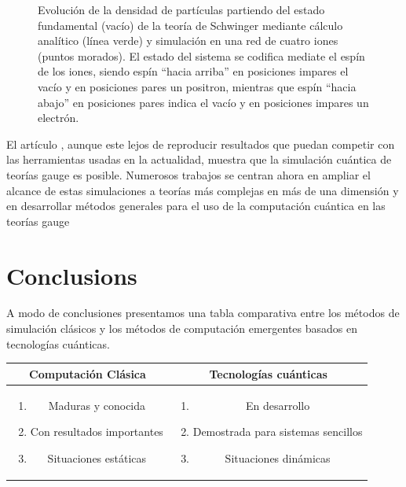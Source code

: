 \documentclass[a4paper,10pt]{article}
\begin{document}
\begin{multicols}{2}
\begin{figure}[H]
\begin{center}
\end{center}
\caption{Evolución de la densidad de partículas partiendo del estado fundamental (vacío) de la teoría de Schwinger mediante cálculo analítico (línea verde) y simulación en una red de cuatro iones (puntos morados). El estado del sistema se codifica mediate el espín de los iones, siendo espín ``hacia arriba'' en posiciones impares el vacío y en posiciones pares un positron, mientras que espín ``hacia abajo'' en posiciones pares indica el vacío y en posiciones impares un electrón.}
\label{SchwingerDensity}
\end{figure}

El artículo \cite{martinez_real-time_2016}, aunque este lejos de reproducir resultados que puedan competir con las herramientas usadas en la actualidad, muestra que la simulación cuántica de teorías gauge es posible. Numerosos trabajos se centran ahora en ampliar el alcance de estas simulaciones a teorías más complejas en más de una dimensión \cite{davoudi_towards_2020,paulson_towards_2021} y en desarrollar métodos generales para el uso de la computación cuántica en las teorías gauge \cite{banuls_simulating_2020,kan_lattice_2022}

\section{Conclusions}
A modo de conclusiones presentamos una tabla comparativa entre los métodos de simulación clásicos y los métodos de computación emergentes basados en tecnologías cuánticas.

\begin{tabular}{c|c}
Computación Clásica & Tecnologías cuánticas \\
\hline
\begin{minipage}{0.2\textwidth}
\begin{enumerate}
\item Maduras y conocida
\item Con resultados importantes
\item Situaciones estáticas
\end{enumerate}
\end{minipage}

&

\begin{minipage}{0.2\textwidth}
\begin{enumerate}
\item En desarrollo
\item Demostrada para sistemas sencillos
\item Situaciones dinámicas
\end{enumerate}
\end{minipage}


\end{tabular}
\end{multicols}
\end{document}
